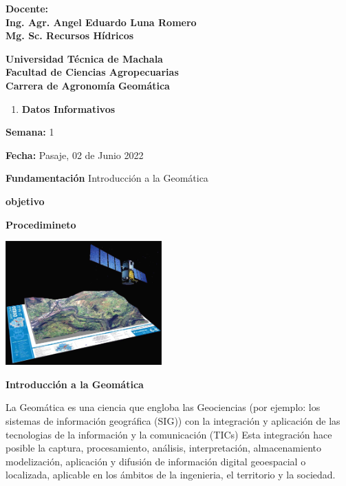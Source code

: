 \documentclass[
]{article}
\providecommand{\tightlist}{%
  \setlength{\itemsep}{0pt}\setlength{\parskip}{0pt}}
\begin{document}
\begin{tcolorbox}[colback=amarillo!30!white, sharp corners=uphill, colframe = amarillo,arc = 25mm]
\begin{titlepage}
\begin{center}
    {\large\textbf{Docente:}}\\\vspace{1cm}
    \textcolor{coolblack}{\LARGE\textbf{Ing. Agr. Angel Eduardo Luna Romero}}
    \\\vspace{0.5cm}
        \textcolor{coolblack}{\LARGE\textbf{    Mg. Sc. Recursos Hídricos}}
\end{center}
\end{titlepage}
\end{tcolorbox}

\newpage
\begin{center}
{\large \textbf{Universidad Técnica de Machala}}\\
\textbf{Facultad de Ciencias Agropecuarias}\\
\textbf{Carrera de Agronomía}
\vspace{2mm}
\textbf{Geomática}
\end{center}

\begin{enumerate}
\def\labelenumi{\arabic{enumi}.}
\tightlist
\item
  \textbf{Datos Informativos}
\end{enumerate}

\textbf{Semana:} 1

\textbf{Fecha:} Pasaje, 02 de Junio 2022

\textbf{Fundamentación} Introducción a la Geomática

\textbf{objetivo}

\textbf{Procedimineto}

\includegraphics[width=\textwidth,height=1.875in]{int.jpg}

\begin{center}
{\large \textbf{Introducción a la Geomática}}\\

\end{center}
\justify

La Geomática es una ciencia que engloba las Geociencias (por ejemplo:
los sistemas de información geográfica (SIG)) con la integración y
aplicación de las tecnologias de la información y la comunicación (TICs)
Esta integración hace posible la captura, procesamiento, análisis,
interpretación, almacenamiento modelización, aplicación y difusión de
información digital geoespacial o localizada, aplicable en los ámbitos
de la ingenieria, el territorio y la sociedad.
\end{document}
